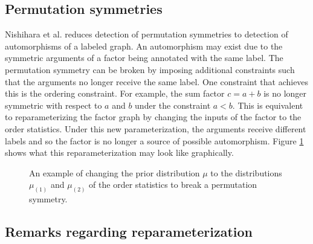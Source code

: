 \subsection{Permutation symmetries}

Nishihara et al. reduces detection of permutation symmetries to detection of automorphisms of a labeled graph. An automorphism may exist due to the symmetric arguments of a factor being annotated with the same label. The permutation symmetry can be broken by imposing additional constraints such that the arguments no longer receive the same label. One constraint that achieves this is the ordering constraint. For example, the sum factor $c=a+b$ is no longer symmetric with respect to $a$ and $b$ under the constraint $a<b$. This is equivalent to reparameterizing the factor graph by changing the inputs of the factor to the order statistics. Under this new parameterization, the arguments receive different labels and so the factor is no longer a source of possible automorphism. Figure \ref{fig:changeprior} shows what this reparameterization may look like graphically.

\begin{figure}[h]
\begin{center}
\hspace*{2cm}
\end{center}
\caption{An example of changing the prior distribution $\mu$ to the distributions $\mu_{(1)}$ and $\mu_{(2)}$ of the order statistics to break a permutation symmetry.}
\label{fig:changeprior}
\end{figure}


\subsection{Remarks regarding reparameterization}

